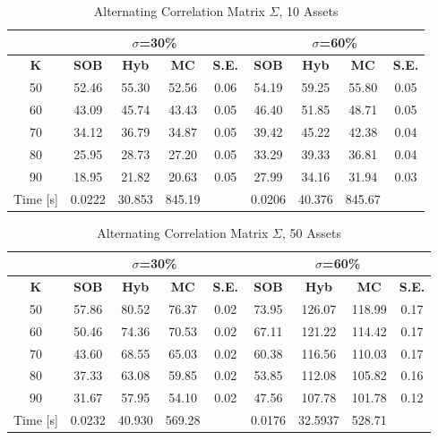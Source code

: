 \documentclass[a4paper]{article}
\begin{document}
\begin {table}
\caption {Alternating Correlation Matrix $\Sigma$, 10 Assets} 
\begin{center}
\begin{tabular}{c|c c c c|c c c c}
\hline
\multicolumn{1}{c|}{} & \multicolumn{4}{|c|}{$\sigma$=30\%} & \multicolumn{4}{|c}{$\sigma$=60\%} \\ 
\hline
  \textbf{K} & \textbf{SOB} & \textbf{Hyb} & \textbf{MC} & \textbf{S.E.} & \textbf{SOB} & \textbf{Hyb} & \textbf{MC} & \textbf{S.E.} \\
50 &	52.46&55.30	&52.56  &0.06  &54.19  &59.25&55.80&0.05  \\
60 & 	43.09&45.74 	&43.43  &0.05  &46.40  &51.85&48.71&0.05  \\
70 & 	34.12&36.79 	&34.87  &0.05  &39.42  &45.22&42.38&0.04  \\
80 & 	25.95&28.73 	&27.20  &0.05  &33.29  &39.33&36.81&0.04  \\
90 &  18.95&21.82 	&20.63  &0.05  &27.99  &34.16&31.94&0.03  \\
\hline
Time [s] & 0.0222&30.853 &845.19 & &0.0206  &40.376& 845.67& \\
\hline
\end{tabular}
\end{center}
\end{table}

\begin {table}
\caption {Alternating Correlation Matrix $\Sigma$, 50 Assets} 
\begin{center}
\begin{tabular}{c|c c c c|c c c c}
\hline
\multicolumn{1}{c|}{} & \multicolumn{4}{|c|}{$\sigma$=30\%} & \multicolumn{4}{|c}{$\sigma$=60\%} \\ 
\hline
  \textbf{K} & \textbf{SOB} & \textbf{Hyb}	& \textbf{MC} & \textbf{S.E.} & \textbf{SOB} & \textbf{Hyb} & \textbf{MC} & \textbf{S.E.}\\
50 &	57.86&80.52 	& 76.37  & 0.02 & 73.95  &126.07 &118.99 &0.17 \\
60 & 	50.46& 74.36& 70.53 & 0.02&67.11 &121.22 & 114.42&0.17 \\
70 & 43.60& 68.55& 65.03& 0.02& 60.38&116.56&110.03&0.17\\
80 & 	37.33& 63.08& 59.85& 0.02&53.85&112.08&105.82&0.16 \\
90 & 31.67& 57.95& 54.10& 0.02&47.56&107.78&101.78&0.12\\
\hline
Time [s]&0.0232 &40.930 & 569.28 & &0.0176 &32.5937 & 528.71 & \\
\hline
\end{tabular}
\end{center}
\end{table}
\end{document}
